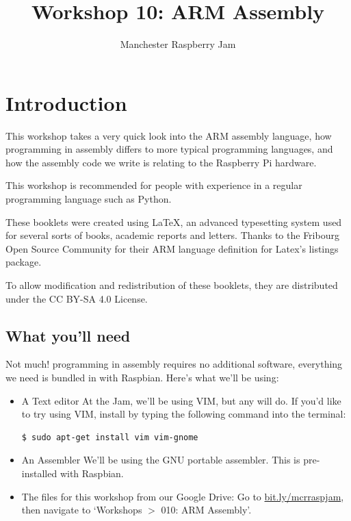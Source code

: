 \documentclass[a4paper, twocolumn, twoside, 11pt]{article}
\begin{document}
	\author{Manchester Raspberry Jam}
	\title{Workshop 10: ARM Assembly}
	\date{}

	\maketitle
	
	\setcounter{tocdepth}{1}
	\tableofcontents
	
	\setcounter{section}{-1}
	\section{Introduction}

		This workshop takes a very quick look into the ARM assembly language, how programming in assembly differs to more typical programming languages, and how the assembly code we write is relating to the Raspberry Pi hardware.
		
		This workshop is recommended for people with experience in a regular programming language such as Python.
		
		These booklets were created using {\selectfont \LaTeX}, an advanced typesetting system used for several sorts of books, academic reports and letters.
		Thanks to the Fribourg Open Source Community for their ARM language definition for Latex's listings package.
		
		To allow modification and redistribution of these booklets, they are distributed under the CC BY-SA 4.0 License.
	
		\subsection*{What you'll need}
			Not much! programming in assembly requires no additional software, everything we need is bundled in with Raspbian. Here's what we'll be using:
	
			\begin{itemize}			
				\item A Text editor
				\scriptsize\newline At the Jam, we'll be using VIM, but any will do. If you'd like to try using VIM, install by typing the following command into the terminal:
				\begin{lstlisting}
$ sudo apt-get install vim vim-gnome
				\end{lstlisting}
				\normalsize
			
				\item An Assembler
				\scriptsize\newline We'll be using the GNU portable assembler. This is pre-installed with Raspbian.
				\normalsize
			
				\item The files for this workshop from our Google Drive:
				\scriptsize\newline Go to \url{bit.ly/mcrraspjam}, then navigate to `Workshops $>$ 010: ARM Assembly'.
				\normalsize
			\end{itemize}
	
\end{document}
